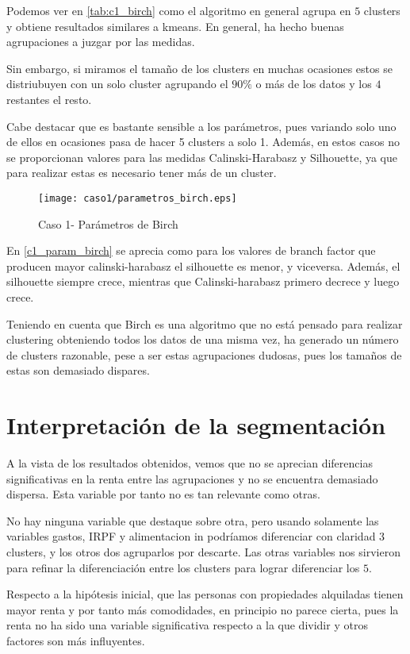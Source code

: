 Podemos ver en \eqref{tab:c1_birch} como el algoritmo en general agrupa en $5$ clusters y obtiene resultados similares a kmeans. En general, ha hecho buenas agrupaciones a juzgar por las medidas.

Sin embargo, si miramos el tamaño de los clusters en muchas ocasiones estos se distriubuyen con un solo cluster agrupando el $90\%$ o más de los datos y los $4$ restantes el resto.

Cabe destacar que es bastante sensible a los parámetros, pues variando solo uno de ellos en ocasiones pasa de hacer 5 clusters a solo 1. Además, en estos casos no se proporcionan valores para las medidas Calinski-Harabasz y Silhouette, ya que para realizar estas es necesario tener más de un cluster.

\begin{figure}[H]
\caption{Caso 1- Parámetros de Birch}
\label{c1_param_birch}
\texttt{[image: caso1/parametros\_birch.eps]}
\end{figure}

En \eqref{c1_param_birch} se aprecia como para los valores de branch factor que producen mayor calinski-harabasz el silhouette es menor, y viceversa. Además, el silhouette siempre crece, mientras que Calinski-harabasz primero decrece y luego crece.

Teniendo en cuenta que Birch es una algoritmo que no está pensado para realizar clustering obteniendo todos los datos de una misma vez, ha generado un número de clusters razonable, pese a ser estas agrupaciones dudosas, pues los tamaños de estas son demasiado dispares.



\section{Interpretación de la segmentación}

A la vista de los resultados obtenidos, vemos que no se aprecian diferencias significativas en la renta entre las agrupaciones y no se encuentra demasiado dispersa. Esta variable por tanto no es tan relevante como otras.

No hay ninguna variable que destaque sobre otra, pero usando solamente las variables gastos, IRPF y alimentacion in podríamos diferenciar con claridad 3 clusters, y los otros dos agruparlos por descarte. Las otras variables nos sirvieron para refinar la diferenciación entre los clusters para lograr diferenciar los $5$.

Respecto a la hipótesis inicial, que las personas con propiedades alquiladas tienen mayor renta y por tanto más comodidades, en principio no parece cierta, pues la renta no ha sido una variable significativa respecto a la que dividir y otros factores son más influyentes.




